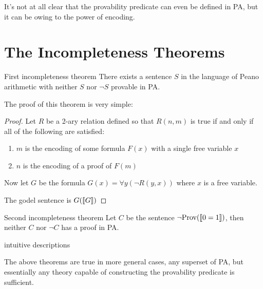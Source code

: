 \documentclass[10pt]{article}
\DeclarePairedDelimiter{\enc}{[\![}{]\!]}
\newcommand{\prov}{\text{Prov}}
\begin{document}
	It's not at all clear that the provability predicate can even be defined in PA, but it can be owing to the power of encoding.
	
	\section{The Incompleteness Theorems}
	
	\begin{theorem}{First incompleteness theorem}{}
		There exists a sentence $S$ in the language of Peano arithmetic with neither $S$ nor $\lnot S$ provable in PA.
	\end{theorem}

	The proof of this theorem is very simple:
	
	\begin{proof}
		Let $R$ be a 2-ary relation defined so that $R(n,m)$ is true if and only if all of the following are satisfied:
		\begin{enumerate}[itemsep=0pt]
			\item $m$ is the encoding of some formula $F(x)$ with a single free variable $x$
			\item $n$ is the encoding of a proof of $F(m)$
		\end{enumerate}
		
		\noindent Now let $G$ be the formula $G(x) = \forall y (\lnot R(y, x))$ where $x$ is a free variable.
		
		The godel sentence is $G(\enc{G})$ 
	\end{proof}

	\begin{theorem}{Second incompleteness theorem}{}
		Let $C$ be the sentence $\lnot\prov(\enc{0=1})$, then neither $C$ nor $\lnot C$ has a proof in PA.		
	\end{theorem}

	\begin{tcolorbox}[colback=red!5!white,colframe=red!75!black,title=TODO]
		intuitive descriptions
	\end{tcolorbox}

	The above theorems are true in more general cases, any superset of PA, but essentially any theory capable of constructing the provability predicate is sufficient.
	
\end{document}
